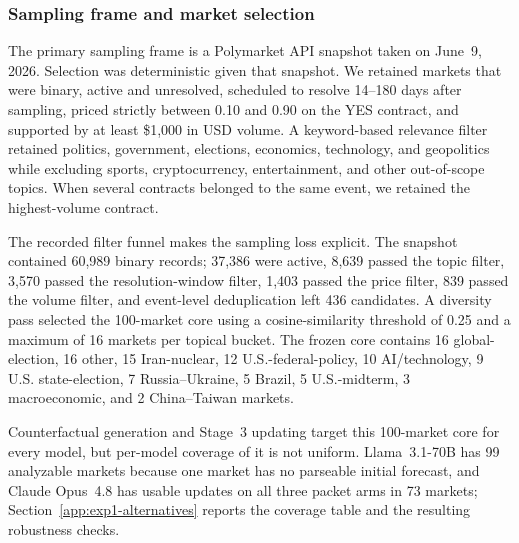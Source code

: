 \subsubsection{Sampling frame and market selection}
\label{app:market-selection}

The primary sampling frame is a Polymarket API snapshot taken on June~9, 2026.
Selection was deterministic given that snapshot.  We retained markets that were
binary, active and unresolved, scheduled to resolve 14--180 days after sampling,
priced strictly between 0.10 and 0.90 on the YES contract, and supported by at least
\$1,000 in USD volume.  A keyword-based relevance filter retained politics,
government, elections, economics, technology, and geopolitics while excluding
sports, cryptocurrency, entertainment, and other out-of-scope topics.  When several
contracts belonged to the same event, we retained the highest-volume contract.

The recorded filter funnel makes the sampling loss explicit.  The snapshot contained
60,989 binary records; 37,386 were active, 8,639 passed the topic filter, 3,570 passed
the resolution-window filter, 1,403 passed the price filter, 839 passed the volume
filter, and event-level deduplication left 436 candidates.  A diversity pass selected
the 100-market core using a cosine-similarity threshold of 0.25 and a maximum of
16 markets per topical bucket.  The frozen core contains 16 global-election,
16 other, 15 Iran-nuclear, 12 U.S.-federal-policy, 10 AI/technology, 9 U.S.
state-election, 7 Russia--Ukraine, 5 Brazil, 5 U.S.-midterm, 3 macroeconomic,
and 2 China--Taiwan markets.

Counterfactual generation and Stage~3 updating target this 100-market core for
every model, but per-model coverage of it is not uniform. Llama~3.1-70B has 99
analyzable markets because one market has no parseable initial forecast, and
Claude Opus~4.8 has usable updates on all three packet arms in 73 markets;
Section~\ref{app:exp1-alternatives} reports the coverage table and the resulting
robustness checks.

\begin{center}
\begin{minipage}{\linewidth}
\centering
{}
\label{tab:markets}
\footnotesize
{}
\end{minipage}
\end{center}

